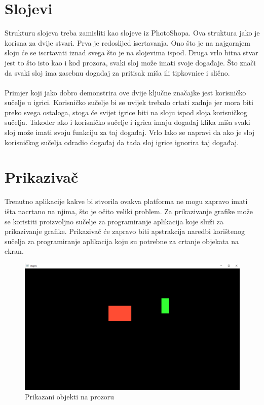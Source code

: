 \documentclass{mathos}
\begin{document}
\section{Slojevi}\label{ss_slojevi}
Strukturu slojeva treba zamisliti kao slojeve iz PhotoShopa. Ova struktura jako je korisna za dvije stvari. Prva je redoslijed iscrtavanja. Ono što je na najgornjem
sloju će se iscrtavati iznad svega što je na slojevima ispod. Druga vrlo bitna stvar jest to što isto kao i kod prozora, svaki sloj može imati svoje događaje.
Što znači da svaki sloj ima zasebnu događaj za pritisak miša ili tipkovnice i slično.
\\ \\
Primjer koji jako dobro demonstrira ove dvije ključne značajke jest korisničko sučelje u igrici. Korisničko sučelje bi se uvijek trebalo crtati zadnje jer mora
biti preko svega ostaloga, stoga će svijet igrice biti na sloju ispod sloja korisničkog sučelja. Također ako i korisničko sučelje i igrica imaju događaj klika miša
svaki sloj može imati svoju funkciju za taj događaj. Vrlo lako se napravi da ako je sloj korisničkog sučelja odradio događaj da tada sloj igrice ignorira taj događaj.
\section{Prikazivač}\label{ss_prikazivač}
Trenutno aplikacije kakve bi stvorila ovakva platforma ne mogu zapravo imati išta nacrtano na njima, što je očito veliki problem. Za prikazivanje grafike može se koristiti
proizvoljno sučelje za programiranje aplikacija koje služi za prikazivanje grafike. Prikazivač će zapravo biti apstrakcija naredbi korištenog sučelja za programiranje aplikacija
koju su potrebne za crtanje objekata na ekran.

\begin{figure}[H]
    \centering
    \includegraphics[scale=0.4]{Slike/Rectangles.png}
    \caption{Prikazani objekti na prozoru}
    \label{im_objekti}
\end{figure}
\end{document}
